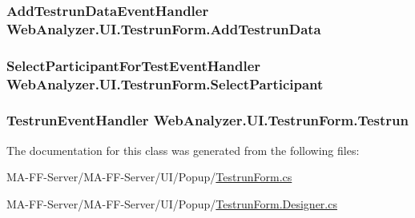 \subsubsection[{Add\+Testrun\+Data}]{\setlength{\rightskip}{0pt plus 5cm}Add\+Testrun\+Data\+Event\+Handler Web\+Analyzer.\+U\+I.\+Testrun\+Form.\+Add\+Testrun\+Data}\label{class_web_analyzer_1_1_u_i_1_1_testrun_form_a29bd18b6bcaf8b884378062e278b99b1}
\hypertarget{class_web_analyzer_1_1_u_i_1_1_testrun_form_a18eca3a8ed7f598778799921d9564428}{}
\subsubsection[{Select\+Participant}]{\setlength{\rightskip}{0pt plus 5cm}Select\+Participant\+For\+Test\+Event\+Handler Web\+Analyzer.\+U\+I.\+Testrun\+Form.\+Select\+Participant}\label{class_web_analyzer_1_1_u_i_1_1_testrun_form_a18eca3a8ed7f598778799921d9564428}
\hypertarget{class_web_analyzer_1_1_u_i_1_1_testrun_form_ac07b8e3d6b66e219b067dcacd1535f2c}{}
\subsubsection[{Testrun}]{\setlength{\rightskip}{0pt plus 5cm}Testrun\+Event\+Handler Web\+Analyzer.\+U\+I.\+Testrun\+Form.\+Testrun}\label{class_web_analyzer_1_1_u_i_1_1_testrun_form_ac07b8e3d6b66e219b067dcacd1535f2c}


The documentation for this class was generated from the following files\+:\begin{DoxyCompactItemize}
\item 
M\+A-\/\+F\+F-\/\+Server/\+M\+A-\/\+F\+F-\/\+Server/\+U\+I/\+Popup/\hyperlink{_testrun_form_8cs}{Testrun\+Form.\+cs}\item 
M\+A-\/\+F\+F-\/\+Server/\+M\+A-\/\+F\+F-\/\+Server/\+U\+I/\+Popup/\hyperlink{_testrun_form_8_designer_8cs}{Testrun\+Form.\+Designer.\+cs}\end{DoxyCompactItemize}
